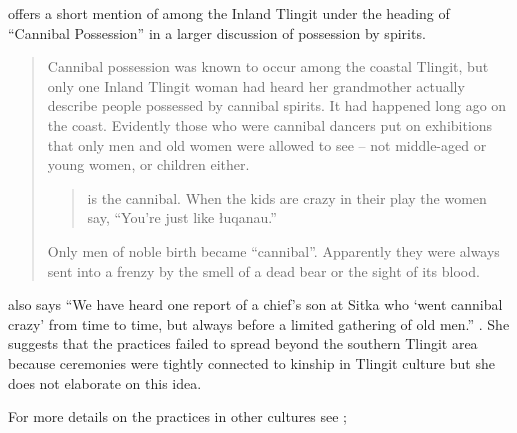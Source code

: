 \citeauthor{mcclellan:1975b} offers a short mention of  among the Inland Tlingit under the heading of “Cannibal Possession” in a larger discussion of possession by spirits.

\begin{quote}\small
Cannibal possession was known to occur among the coastal Tlingit, but only one Inland Tlingit woman had heard her grandmother actually describe people possessed by cannibal spirits.
It had happened long ago on the coast.
Evidently those who were cannibal dancers put on exhibitions that only men and old women were allowed to see – not middle-aged or young women, or children either.

\begin{quote}
 is the cannibal.
When the kids are crazy in their play the women say, “You’re just like łuqanau.”
\end{quote}

Only men of noble birth became “cannibal”.
Apparently they were always sent into a frenzy by the smell of a dead bear or the sight of its blood.
\end{quote}

\citeauthor{mcclellan:1954} also says “We have heard one report of a chief’s son at Sitka who ‘went cannibal crazy’ from time to time, but always before a limited gathering of old men.” \parencite[96]{mcclellan:1954}.
She suggests that the  practices failed to spread beyond the southern Tlingit area because ceremonies were tightly connected to kinship in Tlingit culture \parencites[96]{mcclellan:1954}[567]{mcclellan:1975b} but she does not elaborate on this idea.

For more details on the  practices in other cultures see
\cite[31–33]{barbeau-beynon:1987a};

